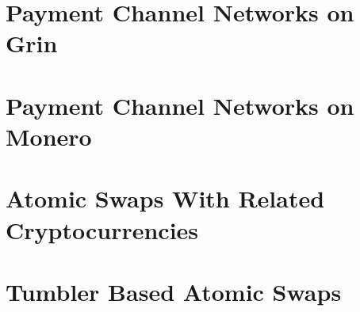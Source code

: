 \section{Payment Channel Networks on Grin}\label{secPaymntChGrin}
\section{Payment Channel Networks on Monero}\label{secPaymntChMon}
\section{Atomic Swaps With Related Cryptocurrencies}\label{secRelSwap}
\section{Tumbler Based Atomic Swaps}\label{secTumplr}